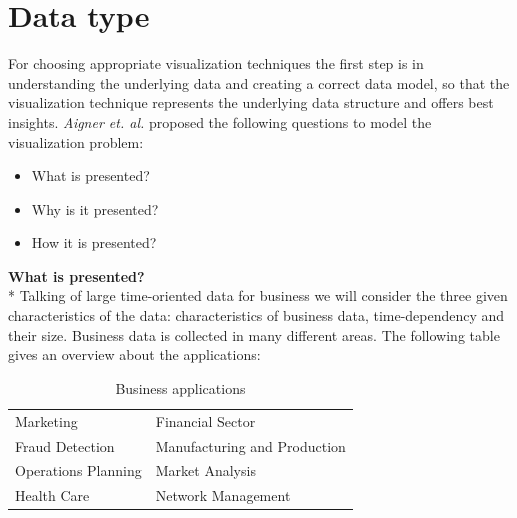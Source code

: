 \section{Data type} \label{data}

For choosing appropriate visualization techniques the first step is in understanding the underlying data and creating a correct data model\cite{Aigner2011}, so that the visualization technique represents the underlying data structure and offers best insights\cite{Bacic}. \textit{Aigner et. al.} proposed  the following questions to model the visualization problem: 

\begin{itemize}
    \item What is presented?
    \item Why is it presented?
    \item How it is presented?
\end{itemize}
\textbf{What is presented?}\\*
Talking of large time-oriented data for business we will consider the three given characteristics of the data: characteristics of business data, time-dependency and their size. Business data is collected in many different areas. The following table gives an overview about the applications: 

\begin{table}[th]
	\centering
	\caption[Table 1]{Business applications\cite{Brachman1996,Tegarden1999}}
	\label{businessapplications}
	\begin{tabu}{ll}
	\toprule
	Marketing & Financial Sector \\
	Fraud Detection & Manufacturing and Production \\
	Operations Planning & Market Analysis \\
	Health Care & Network Management\\
	\bottomrule
	\end{tabu}
\end{table}

